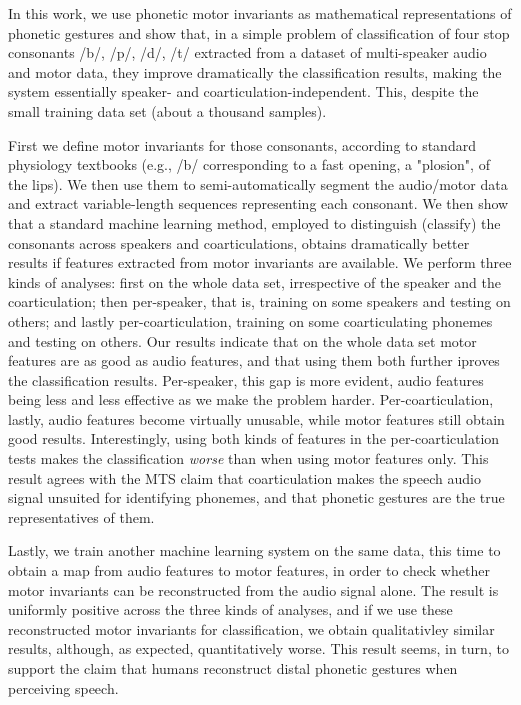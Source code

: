 In this work, we use phonetic motor invariants as mathematical representations
of phonetic gestures and show that, in a simple problem of classification of
four stop consonants /b/, /p/, /d/, /t/ extracted from a dataset of
multi-speaker audio and motor data, they improve dramatically the classification
results, making the system essentially speaker- and coarticulation-independent.
This, despite the small training data set (about a thousand samples).

First we define motor invariants for those consonants, according to standard
physiology textbooks (e.g., /b/ corresponding to a fast opening, a "plosion", of the lips).
We then use them to semi-automatically segment the audio/motor data and extract
variable-length sequences representing each consonant.
We then show that a standard machine learning method, employed to distinguish
(classify) the consonants across speakers and coarticulations, obtains
dramatically better results if features extracted from motor invariants are
available. We perform three kinds of analyses: first on the whole data set, irrespective
of the speaker and the coarticulation; then per-speaker, that is, training on
some speakers and testing on others; and lastly per-coarticulation, training
on some coarticulating phonemes and testing on others. Our results indicate that
on the whole data set motor features are as good as audio features, and that
using them both further iproves the classification results. Per-speaker, this gap
is more evident, audio features being less and less effective as we make the
problem harder. Per-coarticulation, lastly, audio features become virtually
unusable, while motor features still obtain good results. Interestingly,
using both kinds of features in the per-coarticulation tests makes the
classification \emph{worse} than when using motor features only.
This result agrees with the MTS claim that coarticulation makes
the speech audio signal unsuited for identifying phonemes, and that phonetic
gestures are the true representatives of them.

Lastly, we train another machine learning system on the same data, this time
to obtain a map from audio features to motor features,
in order to check whether motor invariants can be reconstructed
from the audio signal alone. The result is uniformly positive across the three
kinds of analyses, and if we use these reconstructed motor invariants for
classification, we obtain qualitativley similar results, although, as expected,
quantitatively worse. This result seems, in turn, to support the claim
\cite{...} that humans reconstruct distal phonetic gestures when perceiving
speech.
